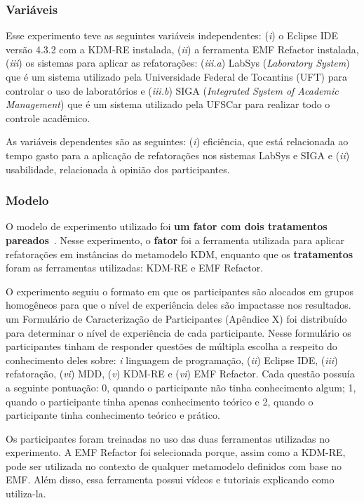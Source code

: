 \subsubsection{Variáveis}

Esse experimento teve as seguintes variáveis independentes: (\textit{i}) o Eclipse IDE versão 4.3.2 com a KDM-RE instalada, (\textit{ii}) a ferramenta EMF Refactor instalada, (\textit{iii}) os sistemas para aplicar as refatorações: (\textit{iii.a}) LabSys (\textit{Laboratory System}) que é um sistema utilizado pela Universidade Federal de Tocantins (UFT) para controlar o uso de laboratórios e (\textit{iii.b}) SIGA (\textit{Integrated System of Academic Management}) que é um sistema utilizado pela UFSCar para realizar todo o controle acadêmico.

As variáveis dependentes são as seguintes: (\textit{i}) eficiência, que está relacionada ao tempo gasto para a aplicação de refatorações nos sistemas LabSys e SIGA e (\textit{ii}) usabilidade, relacionada à opinião dos participantes.

\subsubsection{Modelo}
 
O modelo de experimento utilizado foi \textbf{um fator com dois tratamentos pareados}~\cite{Wohlin}. Nesse experimento, o \textbf{fator} foi a ferramenta utilizada para aplicar refatorações em instâncias do metamodelo KDM, enquanto que os \textbf{tratamentos} foram as ferramentas utilizadas: KDM-RE e EMF Refactor. 

O experimento seguiu o formato em que os participantes são alocados em grupos homogêneos para que o nível de experiência deles são impactasse nos resultados. um Formulário de Caracterização de Participantes (Apêndice X) foi distribuído para determinar o nível de experiência de cada participante. Nesse formulário os participantes tinham de responder questões de múltipla escolha a respeito do conhecimento deles sobre: \textit{i} linguagem de programação, (\textit{ii}) Eclipse IDE, (\textit{iii}) refatoração, (\textit{vi}) MDD, (\textit{v}) KDM-RE e (\textit{vi}) EMF Refactor. Cada questão possuía a seguinte pontuação: 0, quando o participante não tinha conhecimento algum; 1, quando o participante tinha apenas conhecimento teórico e 2, quando o participante tinha conhecimento teórico e prático.

Os participantes foram treinadas no uso das duas ferramentas utilizadas no experimento. A EMF Refactor foi selecionada porque, assim como a KDM-RE, pode ser utilizada no contexto de qualquer  metamodelo definidos com base no EMF. Além disso, essa ferramenta possui vídeos e tutoriais explicando como utiliza-la. 

